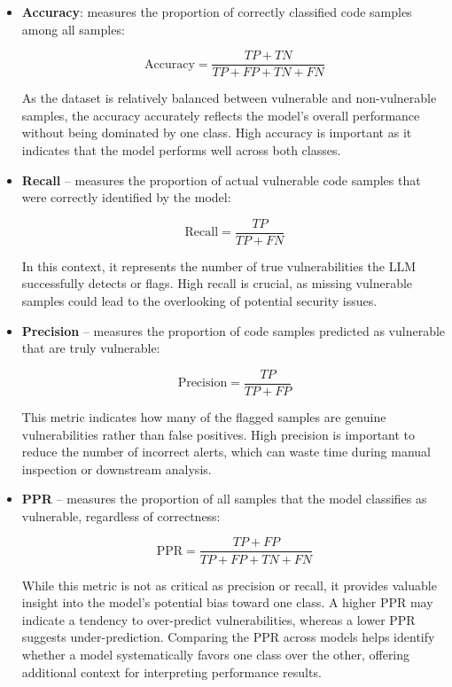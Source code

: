 \documentclass[lettersize,journal]{IEEEtran}
\begin{document}
\begin{itemize}
    \item \textbf{Accuracy}: measures the proportion of correctly classified code samples among all samples:

    \begin{equation}
    \text{Accuracy} = \frac{TP+TN}{TP+FP+TN+FN}
    \end{equation}

    As the dataset is relatively balanced between vulnerable and non-vulnerable samples, the accuracy accurately reflects the model’s overall performance without being dominated by one class. High accuracy is important as it indicates that the model performs well across both classes.

    \item \textbf{Recall} – measures the proportion of actual vulnerable code samples that were correctly identified by the model:

    \begin{equation}
        \text{Recall} = \frac{TP}{TP+FN}
    \end{equation}

    In this context, it represents the number of true vulnerabilities the \gls{LLM} successfully detects or flags. High recall is crucial, as missing vulnerable samples could lead to the overlooking of potential security issues.

    \item \textbf{Precision} – measures the proportion of code samples predicted as vulnerable that are truly vulnerable: 

    \begin{equation}
        \text{Precision} = \frac{TP}{TP+FP}
    \end{equation}

    This metric indicates how many of the flagged samples are genuine vulnerabilities rather than false positives. High precision is important to reduce the number of incorrect alerts, which can waste time during manual inspection or downstream analysis.

    \item \textbf{\gls{PPR}} – measures the proportion of all samples that the model classifies as vulnerable, regardless of correctness:

    \begin{equation}
    \text{PPR} = \frac{TP+FP}{TP+FP+TN+FN}
    \end{equation}

    While this metric is not as critical as precision or recall, it provides valuable insight into the model’s potential bias toward one class. A higher PPR may indicate a tendency to over-predict vulnerabilities, whereas a lower PPR suggests under-prediction. Comparing the PPR across models helps identify whether a model systematically favors one class over the other, offering additional context for interpreting performance results.

\end{itemize}
\end{document}
